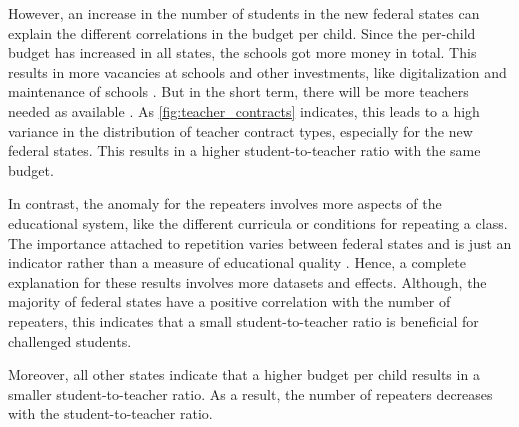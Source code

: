 However,  an increase in the number of students in the new federal states can explain the different correlations in the budget per child. Since the per-child budget has increased in all states, the schools got more money in total. This results in more vacancies at schools \cite{kultusminister_konferenz_lehrkrafteeinstellungsbedarf_2023} and other investments, like digitalization and maintenance of schools \cite{bundesministerium_fur_bildung_und_forschung_fortschrittsbericht_2022}. But in the short term, there will be more teachers needed as available \cite{kultusminister_konferenz_lehrkrafteeinstellungsbedarf_2023}. As \autoref{fig:teacher_contracts} indicates, this leads to a high variance in the distribution of teacher contract types, especially for the new federal states. This results in a higher student-to-teacher ratio with the same budget.

In contrast, the anomaly for the repeaters involves more aspects of the educational system, like the different curricula or conditions for repeating a class. The importance attached to repetition varies between federal states and is just an indicator rather than a measure of educational quality \cite{klemm_klassenwiederholungen_2009}. Hence, a complete explanation for these results involves more datasets and effects. Although, the majority of federal states have a positive correlation with the number of repeaters, this indicates that a small student-to-teacher ratio is beneficial for challenged students.

Moreover, all other states indicate that a higher budget per child results in a smaller student-to-teacher ratio. As a result, the number of repeaters decreases with the student-to-teacher ratio.